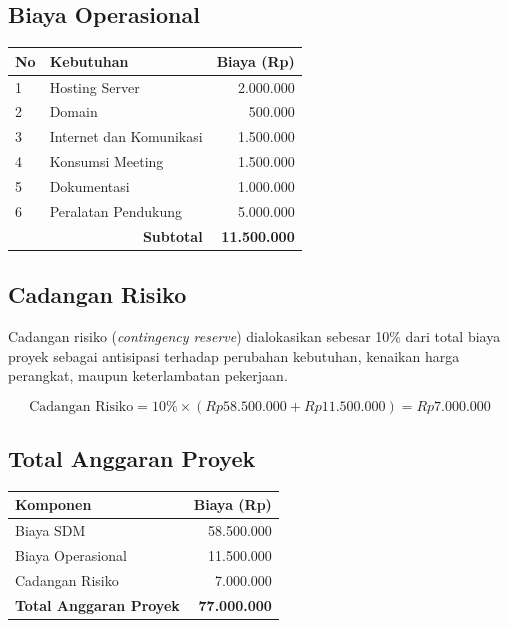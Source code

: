 \documentclass[12pt,a4paper]{article}
\begin{document}
\subsection{Biaya Operasional}

\begin{table}[H]
\centering
\begin{tabular}{p{0.8cm}p{6cm}r}
\toprule
\textbf{No} & \textbf{Kebutuhan} & \textbf{Biaya (Rp)}\\
\midrule
1 & Hosting Server & 2.000.000\\
2 & Domain & 500.000\\
3 & Internet dan Komunikasi & 1.500.000\\
4 & Konsumsi Meeting & 1.500.000\\
5 & Dokumentasi & 1.000.000\\
6 & Peralatan Pendukung & 5.000.000\\
\midrule
\multicolumn{2}{r}{\textbf{Subtotal}} & \textbf{11.500.000}\\
\bottomrule
\end{tabular}
\end{table}

\subsection{Cadangan Risiko}

Cadangan risiko (\textit{contingency reserve}) dialokasikan sebesar 10\% dari total biaya proyek sebagai antisipasi terhadap perubahan kebutuhan, kenaikan harga perangkat, maupun keterlambatan pekerjaan.

\[
\text{Cadangan Risiko}
=
10\%
\times
(Rp58.500.000 + Rp11.500.000)
=
Rp7.000.000
\]

\subsection{Total Anggaran Proyek}

\begin{table}[H]
\centering
\begin{tabular}{lr}
\toprule
\textbf{Komponen} & \textbf{Biaya (Rp)}\\
\midrule
Biaya SDM & 58.500.000\\
Biaya Operasional & 11.500.000\\
Cadangan Risiko & 7.000.000\\
\midrule
\textbf{Total Anggaran Proyek} & \textbf{77.000.000}\\
\bottomrule
\end{tabular}
\end{table}
\end{document}
